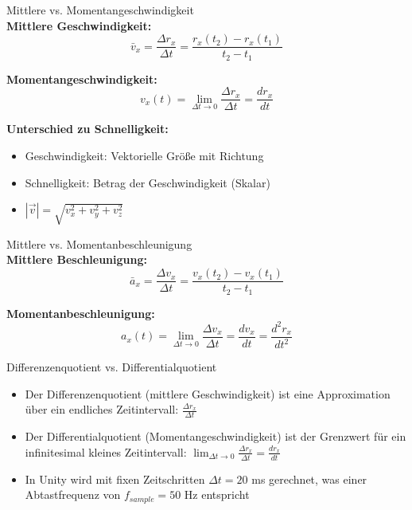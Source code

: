 \begin{definition}{Mittlere vs. Momentangeschwindigkeit}\\
    \textbf{Mittlere Geschwindigkeit:}
    \begin{equation}
        \bar{v}_x = \frac{\Delta r_x}{\Delta t} = \frac{r_x(t_2) - r_x(t_1)}{t_2 - t_1}
    \end{equation}
    
    \textbf{Momentangeschwindigkeit:}
    \begin{equation}
        v_x(t) = \lim_{\Delta t \to 0} \frac{\Delta r_x}{\Delta t} = \frac{dr_x}{dt}
    \end{equation}
    
    \textbf{Unterschied zu Schnelligkeit:}
    \begin{itemize}
        \item Geschwindigkeit: Vektorielle Größe mit Richtung
        \item Schnelligkeit: Betrag der Geschwindigkeit (Skalar)
        \item $|\vec{v}| = \sqrt{v_x^2 + v_y^2 + v_z^2}$
    \end{itemize}
\end{definition}

\begin{definition}{Mittlere vs. Momentanbeschleunigung}\\
    \textbf{Mittlere Beschleunigung:}
    \begin{equation}
        \bar{a}_x = \frac{\Delta v_x}{\Delta t} = \frac{v_x(t_2) - v_x(t_1)}{t_2 - t_1}
    \end{equation}
    
    \textbf{Momentanbeschleunigung:}
    \begin{equation}
        a_x(t) = \lim_{\Delta t \to 0} \frac{\Delta v_x}{\Delta t} = \frac{dv_x}{dt} = \frac{d^2r_x}{dt^2}
    \end{equation}
\end{definition}

\begin{concept}{Differenzenquotient vs. Differentialquotient}\\
    \begin{itemize}
        \item Der Differenzenquotient (mittlere Geschwindigkeit) ist eine Approximation über ein endliches Zeitintervall: $\frac{\Delta r_x}{\Delta t}$
        \item Der Differentialquotient (Momentangeschwindigkeit) ist der Grenzwert für ein infinitesimal kleines Zeitintervall: $\lim_{\Delta t \to 0} \frac{\Delta r_x}{\Delta t} = \frac{dr_x}{dt}$
        \item In Unity wird mit fixen Zeitschritten $\Delta t = 20$ ms gerechnet, was einer Abtastfrequenz von $f_{sample} = 50$ Hz entspricht
    \end{itemize}
\end{concept}

